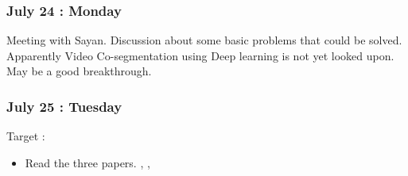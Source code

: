 \documentclass{article}
\begin{document}
\subsubsection{July 24 : Monday}
Meeting with Sayan. Discussion about some basic problems that could be solved. Apparently Video Co-segmentation using Deep learning is not yet looked upon. May be a good breakthrough.

\subsubsection{July 25 : Tuesday}
Target :
\begin{itemize}
\item Read the three papers. \cite{7120111} , \cite{7401081}, \cite{Zhang2014}
\end{itemize}



\end{document}
